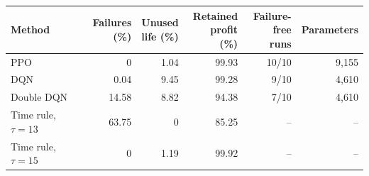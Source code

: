 {\footnotesize\setlength{\tabcolsep}{2.5pt}\renewcommand{\arraystretch}{1.08}%
\begin{tabular}{@{}lrrrrr@{}}
\toprule
Method & \shortstack{Failures\\(\%)} & \shortstack{Unused\\life (\%)} & \shortstack{Retained\\profit (\%)} & \shortstack{Failure-\\free runs} & Parameters\\
\midrule
PPO & 0 & 1.04 & 99.93 & 10/10 & 9,155\\
DQN & 0.04 & 9.45 & 99.28 & 9/10 & 4,610\\
Double DQN & 14.58 & 8.82 & 94.38 & 7/10 & 4,610\\
\midrule
Time rule, $\tau=13$ & 63.75 & 0 & 85.25 & -- & --\\
Time rule, $\tau=15$ & 0 & 1.19 & 99.92 & -- & --\\
\bottomrule
\end{tabular}}
